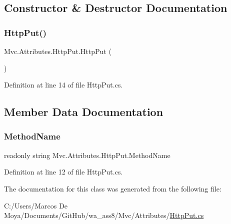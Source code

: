 \subsection{Constructor \& Destructor Documentation}
\mbox{\label{class_mvc_1_1_attributes_1_1_http_put_a262107e29b10590138060ef6de9f2823}} 
\subsubsection{\texorpdfstring{Http\+Put()}{HttpPut()}}
{\footnotesize\ttfamily Mvc.\+Attributes.\+Http\+Put.\+Http\+Put (\begin{DoxyParamCaption}{ }\end{DoxyParamCaption})}



Definition at line 14 of file Http\+Put.\+cs.



\subsection{Member Data Documentation}
\mbox{\label{class_mvc_1_1_attributes_1_1_http_put_ad02aa0515bd2e615805ba3c0f0fcc039}} 
\subsubsection{\texorpdfstring{Method\+Name}{MethodName}}
{\footnotesize\ttfamily readonly string Mvc.\+Attributes.\+Http\+Put.\+Method\+Name}



Definition at line 12 of file Http\+Put.\+cs.



The documentation for this class was generated from the following file\+:\begin{DoxyCompactItemize}
\item 
C\+:/\+Users/\+Marcos De Moya/\+Documents/\+Git\+Hub/wa\+\_\+ass8/\+Mvc/\+Attributes/\hyperlink{_http_put_8cs}{Http\+Put.\+cs}\end{DoxyCompactItemize}
